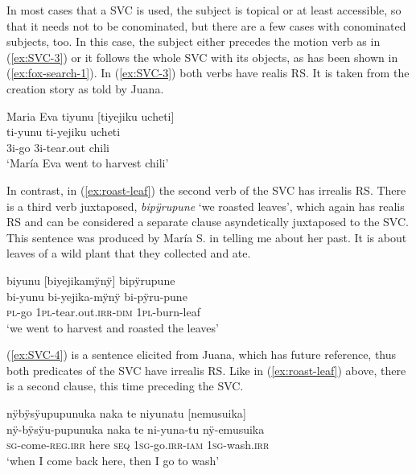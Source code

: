 In most cases that a SVC is used, the subject is topical or at least accessible, so that it needs not to be conominated, but there are a few cases with conominated subjects, too. In this case, the subject either precedes the motion verb as in (\ref{ex:SVC-3}) or it follows the whole SVC with its objects, as has been shown in (\ref{ex:fox-search-1}). In (\ref{ex:SVC-3}) both verbs have realis RS. It is taken from the creation story as told by Juana.

\ea\label{ex:SVC-3}
\begingl
\glpreamble Maria Eva tiyunu \textup{[}tiyejiku ucheti\textup{]}\\
 ti-yunu ti-yejiku ucheti\\
 3i-go 3i-tear.out chili\\
\glft ‘María Eva went to harvest chili’
\endgl
\trailingcitation{[jxx-n101013s-1.383]}
\xe

In contrast, in (\ref{ex:roast-leaf}) the second verb of the SVC has irrealis RS. There is a third verb juxtaposed, \textit{bipÿrupune} ‘we roasted leaves’, which again has realis RS and can be considered a separate clause asyndetically juxtaposed to the SVC. This sentence was produced by María S. in telling me about her past. It is about leaves of a wild plant that they collected and ate. 

\ea\label{ex:roast-leaf}
\begingl
\glpreamble biyunu \textup{[}biyejikamÿnÿ\textup{]} bipÿrupune\\
\gla bi-yunu bi-yejika-mÿnÿ bi-pÿru-pune\\
\textsc{pl}-go 1\textsc{pl}-tear.out.\textsc{irr}-\textsc{dim} 1\textsc{pl}-burn-leaf\\
\glft ‘we went to harvest and roasted the leaves’
\endgl
\trailingcitation{[rxx-p181101l-2.223]}
\xe

(\ref{ex:SVC-4}) is a sentence elicited from Juana, which has future reference, thus both predicates of the SVC have irrealis RS. Like in (\ref{ex:roast-leaf}) above, there is a second clause, this time preceding the SVC. 

\ea\label{ex:SVC-4}
\begingl
\glpreamble nÿbÿsÿupupunuka naka te niyunatu \textup{[}nemusuika\textup{]}\\
\gla nÿ-bÿsÿu-pupunuka naka te ni-yuna-tu nÿ-emusuika\\
\textsc{sg}-come-\textsc{reg.irr} here \textsc{seq} 1\textsc{sg}-go.\textsc{irr}-\textsc{iam} 1\textsc{sg}-wash.\textsc{irr}\\
\glft ‘when I come back here, then I go to wash’
\endgl
\trailingcitation{[jxx-e190210s-01]}
\xe


